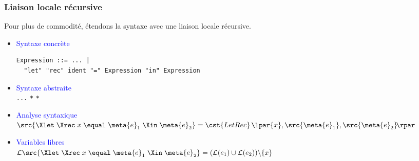 %
\begin{frame}[containsverbatim]
\frametitle{Liaison locale récursive}

Pour plus de commodité, étendons la syntaxe avec une liaison locale
récursive.
\begin{itemize}

  \item \textcolor{blue}{Syntaxe concrète}
    {\small
     \begin{verbatim}
Expression ::= ... |
  "let" "rec" ident "=" Expression "in" Expression
     \end{verbatim}}

  \vspace*{-6pt}

  \item \textcolor{blue}{Syntaxe abstraite}\\ \Xtype
   \equal \texttt{...} \vbar {} \Xof
   \texttt{*}  \texttt{*} \semi

  \medskip

  \item \textcolor{blue}{Analyse syntaxique}\\ $\src{\Xlet \; \Xrec \;
  x \; \equal \; \meta{e}_1 \; \Xin \; \meta{e}_2} =
  \cst{LetRec} \, \lpar{x}, \src{\meta{e}_1}, \src{\meta{e}_2}\!\rpar$

  \medskip

  \item \textcolor{blue}{Variables libres}\\ ${\cal L} \src{\Xlet \;
  \Xrec \; x \; \equal \; \meta{e}_1 \; \Xin \; \meta{e}_2}
  = ({\cal L} (e_1) \cup {\cal L} (e_2)) \backslash \{x\}$

\end{itemize}

\end{frame}


